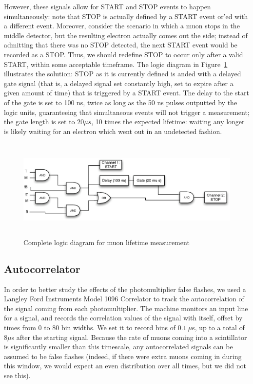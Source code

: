 However, these signals allow for START and STOP events to happen simultaneously: note that STOP is actually defined by a START event or'ed with a different event. Moreover, consider the scenario in which a muon stops in the middle detector, but the resulting electron actually comes out the side; instead of admitting that there was no STOP detected, the next START event would be recorded as a STOP. Thus, we should redefine STOP to occur only after a valid START, within some acceptable timeframe. The logic diagram in Figure~\ref{figure:logic} illustrates the solution: STOP as it is currently defined is anded with a delayed gate signal (that is, a delayed signal set constantly high, set to expire after a given amount of time) that is triggered by a START event. The delay to the start of the gate is set to 100 ns, twice as long as the 50 ns pulses outputted by the logic units, guaranteeing that simultaneous events will not trigger a measurement; the gate length is set to $20 \mu s$, 10 times the expected lifetime: waiting any longer is likely waiting for an electron which went out in an undetected fashion.

\begin{figure}[htbp]
\begin{center}
\includegraphics[height=50mm]{./figures/logicdiagram.eps}
\caption{\small{Complete logic diagram for muon lifetime measurement}}
\label{figure:logic}
\end{center}
\end{figure}

\subsection{Autocorrelator}
\label{autocorrelator}
In order to better study the effects of the photomultiplier false flashes, we used a Langley Ford Instruments Model 1096 Correlator to track the autocorrelation of the signal coming from each photomultiplier. The machine monitors an input line for a signal, and records the correlation values of the signal with itself, offset by times from $0$ to $80$ bin widths. We set it to record bins of $0.1~\mu$s, up to a total of $8 \mu$s after the starting signal. Because the rate of muons coming into a scintillator is significantly smaller than this timescale, any autocorrelated signals can be assumed to be false flashes (indeed, if there were extra muons coming in during this window, we would expect an even distribution over all times, but we did not see this).

